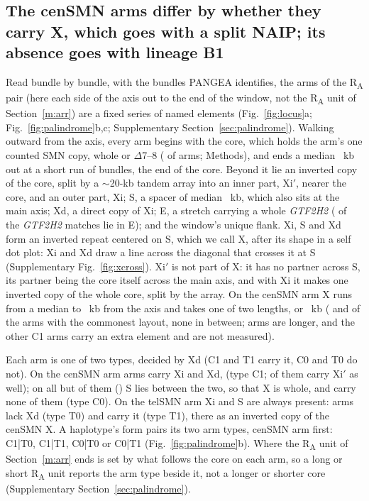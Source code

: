 \documentclass[10pt]{article}
\newcommand{\RU}[1]{R\textsubscript{#1}}%
\begin{document}
\subsection{The cenSMN arms differ by whether they carry X, which goes with a split NAIP; its absence goes with lineage B1}\label{m:arms}
Read bundle by bundle, with the bundles PANGEA identifies, the arms of the \RU{A} pair (here each side of the axis out to the end of the window, not the \RU{A} unit of Section~\ref{m:arr}) are a fixed series of named elements (Fig.~\ref{fig:locus}a; Fig.~\ref{fig:palindrome}b,c; Supplementary Section~\ref{sec:palindrome}). Walking outward from the axis, every arm begins with the core, which holds the arm's one counted SMN copy, whole or $\Delta$7--8 (\armOneCopy{} of \armN{} arms; Methods), and ends a median \elAEnd~kb out at a short run of bundles, the end of the core. Beyond it lie an inverted copy of the core, split by a $\sim$20-kb tandem array into an inner part, Xi$'$, nearer the core, and an outer part, Xi; S, a spacer of median \sLen~kb, which also sits at the main axis; Xd, a direct copy of Xi; E, a stretch carrying a whole \emph{GTF2H2} (\elGtfE{} of the \elGtfAll{} \emph{GTF2H2} matches lie in E); and the window's unique flank. Xi, S and Xd form an inverted repeat centered on S, which we call X, after its shape in a self dot plot: Xi and Xd draw a line across the diagonal that crosses it at S (Supplementary Fig.~\ref{fig:xcross}). Xi$'$ is not part of X: it has no partner across S, its partner being the core itself across the main axis, and with Xi it makes one inverted copy of the whole core, split by the array. On the cenSMN arm X runs from a median \xOutStart{} to \elCXdHi~kb from the axis and takes one of two lengths, \xFormShortKb{} or \xFormLongKb~kb (\xFormShortN{} and \xFormLongN{} of the \xSpanN{} arms with the commonest layout, none in between; \xFormBigN{} arms are longer, and the other \xSpanRest{} C1 arms carry an extra element and are not measured).

Each arm is one of two types, decided by Xd (C1 and T1 carry it, C0 and T0 do not). On the cenSMN arm \elCOne{} arms carry Xi and Xd, (type C1; \xpCOneBoth{} of them carry Xi$'$ as well); on all but \xcNoS{} of them (\xcNoSNames) S lies between the two, so that X is whole, and \elCZero{} carry none of them (type C0). On the telSMN arm Xi and S are always present: \elTZero{} arms lack Xd (type T0) and \elTOne{} carry it (type T1), there as an inverted copy of the cenSMN X. A haplotype's form pairs its two arm types, cenSMN arm first: C1|T0, C1|T1, C0|T0 or C0|T1 (Fig.~\ref{fig:palindrome}b). Where the \RU{A} unit of Section~\ref{m:arr} ends is set by what follows the core on each arm, so a long or short \RU{A} unit reports the arm type beside it, not a longer or shorter core (Supplementary Section~\ref{sec:palindrome}).
\end{document}
